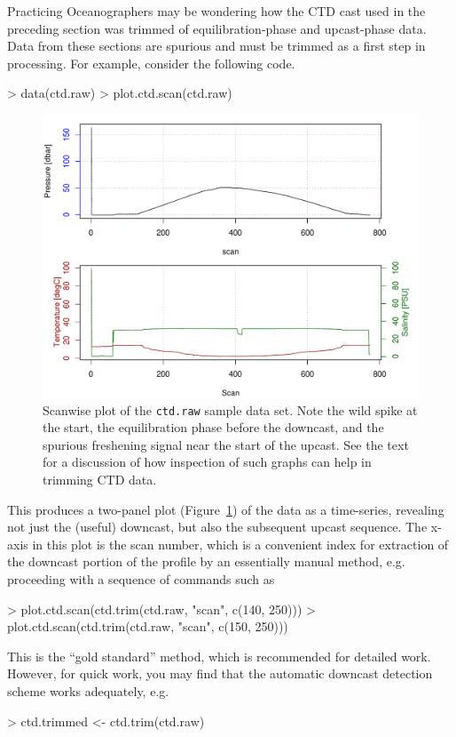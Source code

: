 \documentclass{article}
\begin{document}
Practicing Oceanographers may be wondering how the CTD cast used in the
preceding section was trimmed of equilibration-phase and upcast-phase data. Data
from these sections are spurious and must be trimmed as a first step in
processing. For example, consider the following code.
\begin{Schunk}
\begin{Sinput}
> data(ctd.raw)
> plot.ctd.scan(ctd.raw)
\end{Sinput}
\end{Schunk}
\begin{figure}
\begin{center}
\includegraphics{oce-ctdrawfig}
\end{center}
\caption{Scanwise plot of the \texttt{ctd.raw} sample data set.  Note the wild
spike at the start, the equilibration phase before the downcast, and the
spurious freshening signal near the start of the upcast.  See the text for a
discussion of how inspection of such graphs can help in trimming CTD data.}
\label{fig:ctdraw}
\end{figure}

\noindent This produces a two-panel plot (Figure~\ref{fig:ctdraw}) of the data
as a time-series, revealing not just the (useful) downcast, but also the
subsequent upcast sequence.  The x-axis in this plot is the scan number, which
is a convenient index for extraction of the downcast portion of the profile by
an essentially manual method, e.g. proceeding with a sequence of commands such
as
\begin{Schunk}
\begin{Sinput}
> plot.ctd.scan(ctd.trim(ctd.raw, "scan", c(140, 250)))
> plot.ctd.scan(ctd.trim(ctd.raw, "scan", c(150, 250)))
\end{Sinput}
\end{Schunk}
This is the ``gold standard'' method, which is recommended for detailed
work. However, for quick work, you may find that the automatic downcast
detection scheme works adequately, e.g.
\begin{Schunk}
\begin{Sinput}
> ctd.trimmed <- ctd.trim(ctd.raw)
\end{Sinput}
\end{Schunk}
\end{document}
